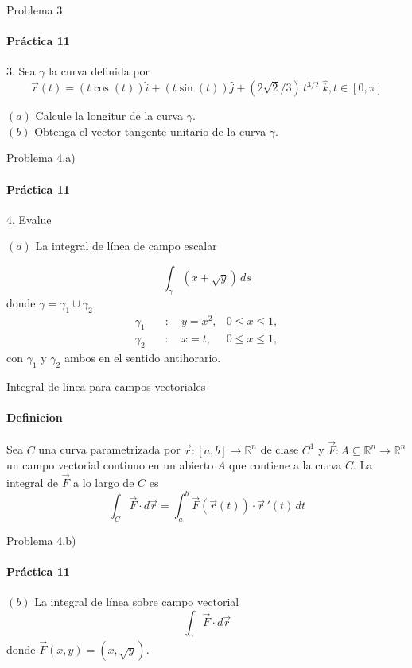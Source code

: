 \documentclass{plantillaPPT}
\begin{document}
\begin{frame}{Problema 3}
    \framesubtitle{Práctica 11}

    3. Sea $\gamma$ la curva definida por
    \begin{equation*}
        \vec{r}(t) = (t\cos(t))\hat{i} + (t\sin(t))\hat{j} + (2\sqrt{2}/3)\,t^{3/2}\;\hat{k}, t\in[0,\pi]
    \end{equation*}

    $(a)$ Calcule la longitur de la curva $\gamma$.\\
    $(b)$ Obtenga el vector tangente unitario de la curva $\gamma$.
    
\end{frame}

\begin{frame}{Problema 4.a)}
    \framesubtitle{Práctica 11}
    4. Evalue

    $(a)$ La integral de línea de campo escalar

    \begin{equation*}
        \int_{\gamma} (x+\sqrt{y})\,ds
    \end{equation*}
    donde $\gamma=\gamma_1 \cup \gamma_2$
    \begin{equation*}
        \begin{aligned}
            \gamma_1 \quad &: \quad y=x^2, &0\leq x \leq 1,\\
            \gamma_2 \quad &: \quad x=t, &0\leq x \leq 1,
        \end{aligned}
    \end{equation*}
    con $\gamma_1$ y $\gamma_2$ ambos en el sentido antihorario.
\end{frame}

\begin{frame}{Integral de linea para campos vectoriales}
    \framesubtitle{Definicion}
    \begin{definicion}
        Sea $C$ una curva parametrizada por $\vec{r}:[a,b] \to \mathbb{R}^n$ de clase $C^1$ y $\vec{F}:A\subseteq\mathbb{R}^n\to\mathbb{R}^n$ un campo vectorial continuo en un abierto $A$ que contiene a la curva $C$. La integral de $\vec{F}$ a lo largo de $C$ es
        \begin{equation*}
            \int_C \vec{F}\cdot d\vec{r} = \int_a^b \vec{F}(\vec{r}(t)) \cdot \vec{r}\,'(t)\,dt
        \end{equation*}
    \end{definicion}
\end{frame}

\begin{frame}{Problema 4.b)}
    \framesubtitle{Práctica 11}

    $(b)$ La integral de línea sobre campo vectorial
    \begin{equation*}
        \int_\gamma \vec{F} \cdot d\vec{r}
    \end{equation*}
    donde $\vec{F}(x,y) = (x,\sqrt{y})$.
\end{frame}
\end{document}
